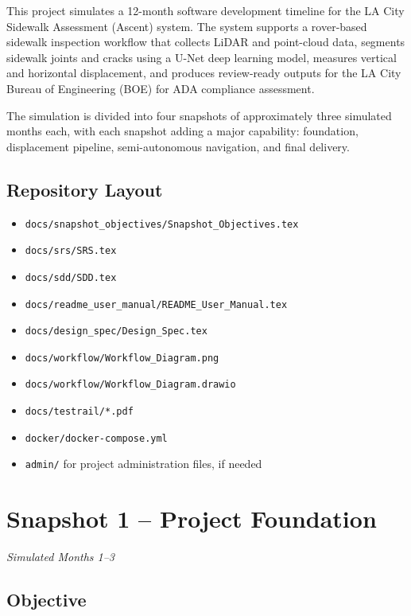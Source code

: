\documentclass[11pt]{article}
\begin{document}
This project simulates a 12-month software development timeline for the LA City Sidewalk Assessment (Ascent) system. The system supports a rover-based sidewalk inspection workflow that collects LiDAR and point-cloud data, segments sidewalk joints and cracks using a U-Net deep learning model, measures vertical and horizontal displacement, and produces review-ready outputs for the LA City Bureau of Engineering (BOE) for ADA compliance assessment.

The simulation is divided into four snapshots of approximately three simulated months each, with each snapshot adding a major capability: foundation, displacement pipeline, semi-autonomous navigation, and final delivery.

\subsection{Repository Layout}

\begin{itemize}[leftmargin=*]
  \item \texttt{docs/snapshot\_objectives/Snapshot\_Objectives.tex}
  \item \texttt{docs/srs/SRS.tex}
  \item \texttt{docs/sdd/SDD.tex}
  \item \texttt{docs/readme\_user\_manual/README\_User\_Manual.tex}
  \item \texttt{docs/design\_spec/Design\_Spec.tex}
  \item \texttt{docs/workflow/Workflow\_Diagram.png}
  \item \texttt{docs/workflow/Workflow\_Diagram.drawio}
  \item \texttt{docs/testrail/*.pdf}
  \item \texttt{docker/docker-compose.yml}
  \item \texttt{admin/} for project administration files, if needed
\end{itemize}

\section{Snapshot 1 -- Project Foundation}

\textit{Simulated Months 1--3}

\subsection{Objective}
\end{document}
